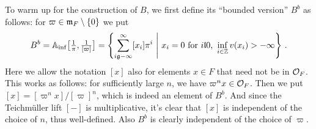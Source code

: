 To warm up for the construction of $B$, we first define its \enquote{bounded version} $B^b$ as follows: for $\varpi\in\mathfrak{m}_F\setminus\{0\}$ we put
\begin{equation*}
	B^b=\IA_\inf\big[\textstyle\frac{1}{\pi},\frac{1}{[\varpi]}\big]\displaystyle=\left\{\sum_{i\gge -\infty}^\infty [x_i]\pi^i\st x_i=0\text{ for }i\lle 0\text{, }\inff_{i\in\IZ}v(x_i)>-\infty\right\}\,.
\end{equation*}
Here we allow the notation $[x]$ also for elements $x\in F$ that need not be in $\mathcal{O}_F$. This works as follows: for sufficiently large $n$, we have $\varpi^nx\in\mathcal{O}_F$. Then we put $[x]=[\varpi^nx]/[\varpi]^n$, which is indeed an element of $B^b$. And since the Teichmüller lift $[-]$ is multiplicative, it's clear that $[x]$ is independent of the choice of $n$, thus well-defined. Also $B^b$ is clearly independent of the choice of $\varpi$.

